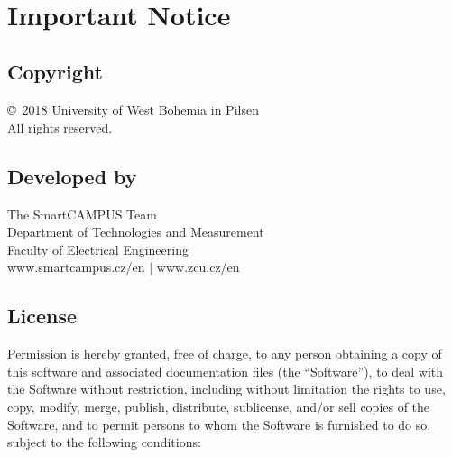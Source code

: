 %
%
%

\clearpage

~

\vfill

\section*{Important Notice}

\subsection*{Copyright}
\copyright ~2018 University of West Bohemia in Pilsen\\
All rights reserved.

\subsection*{Developed by}
The SmartCAMPUS Team\\
Department of Technologies and Measurement\\
Faculty of Electrical Engineering\\
www.smartcampus.cz/en $\mid$ www.zcu.cz/en

\subsection*{License\footnotemark}

Permission is hereby granted, free of charge, to any person obtaining a copy of this software and associated documentation files (the “Software”), to deal with the Software without restriction, including without limitation the rights to use, copy, modify, merge, publish, distribute, sublicense, and/or sell copies of the Software, and to permit persons to whom the Software is furnished to do so, subject to the following conditions:

